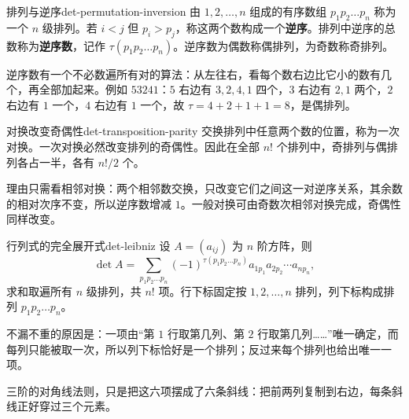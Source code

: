 \begin{mydef}{排列与逆序}{det-permutation-inversion}
由 $1,2,\ldots,n$ 组成的有序数组 $p_1p_2\ldots p_n$ 称为一个 $n$ 级排列。若 $i<j$ 但 $p_i>p_j$，称这两个数构成一个\textbf{逆序}。排列中逆序的总数称为\textbf{逆序数}，记作 $\tau(p_1p_2\ldots p_n)$。逆序数为偶数称偶排列，为奇数称奇排列。
\end{mydef}

逆序数有一个不必数遍所有对的算法：从左往右，看每个数右边比它小的数有几个，再全部加起来。例如 $53241$：$5$ 右边有 $3,2,4,1$ 四个，$3$ 右边有 $2,1$ 两个，$2$ 右边有 $1$ 一个，$4$ 右边有 $1$ 一个，故 $\tau=4+2+1+1=8$，是偶排列。

\begin{conclusion}{对换改变奇偶性}{det-transposition-parity}
交换排列中任意两个数的位置，称为一次对换。一次对换必然改变排列的奇偶性。因此在全部 $n!$ 个排列中，奇排列与偶排列各占一半，各有 $n!/2$ 个。
\end{conclusion}

理由只需看相邻对换：两个相邻数交换，只改变它们之间这一对逆序关系，其余数的相对次序不变，所以逆序数增减 $1$。一般对换可由奇数次相邻对换完成，奇偶性同样改变。

\begin{mydef}{行列式的完全展开式}{det-leibniz}
设 $A=(a_{ij})$ 为 $n$ 阶方阵，则
\[
\det A=\sum_{p_1p_2\ldots p_n}(-1)^{\tau(p_1p_2\ldots p_n)}a_{1p_1}a_{2p_2}\cdots a_{np_n},
\]
求和取遍所有 $n$ 级排列，共 $n!$ 项。行下标固定按 $1,2,\ldots,n$ 排列，列下标构成排列 $p_1p_2\ldots p_n$。
\end{mydef}

不漏不重的原因是：一项由“第 $1$ 行取第几列、第 $2$ 行取第几列……”唯一确定，而每列只能被取一次，所以列下标恰好是一个排列；反过来每个排列也给出唯一一项。

三阶的对角线法则，只是把这六项摆成了六条斜线：把前两列复制到右边，每条斜线正好穿过三个元素。

\begin{center}
\end{center}


